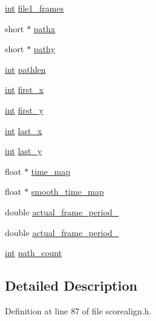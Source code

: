 \begin{DoxyCompactItemize}
\item 
\hyperlink{xmltok_8h_a5a0d4a5641ce434f1d23533f2b2e6653}{int} \hyperlink{class_scorealign_ab0ea5cd44003743384ac8e39752155cb}{file1\+\_\+frames}
\item 
short $\ast$ \hyperlink{class_scorealign_a9aa670b061ce18988086803992d7d1c5}{pathx}
\item 
short $\ast$ \hyperlink{class_scorealign_a6c09342db2cad202c698da99c4ae0e98}{pathy}
\item 
\hyperlink{xmltok_8h_a5a0d4a5641ce434f1d23533f2b2e6653}{int} \hyperlink{class_scorealign_a3a22e20e8be472e87e0f43443c930316}{pathlen}
\item 
\hyperlink{xmltok_8h_a5a0d4a5641ce434f1d23533f2b2e6653}{int} \hyperlink{class_scorealign_ade0b85e4931d63e777ba81efc2cc44a8}{first\+\_\+x}
\item 
\hyperlink{xmltok_8h_a5a0d4a5641ce434f1d23533f2b2e6653}{int} \hyperlink{class_scorealign_a9c7a049717992210177b363266a1bce5}{first\+\_\+y}
\item 
\hyperlink{xmltok_8h_a5a0d4a5641ce434f1d23533f2b2e6653}{int} \hyperlink{class_scorealign_a0b75402da0086bbdce6c20862c4f655f}{last\+\_\+x}
\item 
\hyperlink{xmltok_8h_a5a0d4a5641ce434f1d23533f2b2e6653}{int} \hyperlink{class_scorealign_a2302f07302de5e9791320d7ae610ea71}{last\+\_\+y}
\item 
float $\ast$ \hyperlink{class_scorealign_a9970a288920ebf2706f309a53b3ee362}{time\+\_\+map}
\item 
float $\ast$ \hyperlink{class_scorealign_ab207618c47378f693d84b72f36ac0eb8}{smooth\+\_\+time\+\_\+map}
\item 
double \hyperlink{class_scorealign_afd2fe7e5977be513cf0255a8d3836678}{actual\+\_\+frame\+\_\+period\+\_}
\item 
double \hyperlink{class_scorealign_a446b2b9c38cc31932120ea4749b5eb9f}{actual\+\_\+frame\+\_\+period\+\_}
\item 
\hyperlink{xmltok_8h_a5a0d4a5641ce434f1d23533f2b2e6653}{int} \hyperlink{class_scorealign_af09a47eb9bc5af4ef21bc85bd5959e96}{path\+\_\+count}
\end{DoxyCompactItemize}


\subsection{Detailed Description}


Definition at line 87 of file scorealign.\+h.



